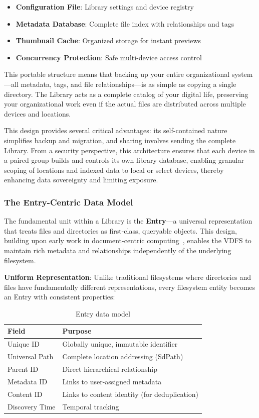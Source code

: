 \documentclass[sigconf]{acmart}
\begin{document}
\begin{itemize}[noitemsep, topsep=0pt]
 \item \textbf{Configuration File}: Library settings and device registry
 \item \textbf{Metadata Database}: Complete file index with relationships and tags
 \item \textbf{Thumbnail Cache}: Organized storage for instant previews
 \item \textbf{Concurrency Protection}: Safe multi-device access control
\end{itemize}

This portable structure means that backing up your entire organizational system—all metadata, tags, and file relationships—is as simple as copying a single directory. The Library acts as a complete catalog of your digital life, preserving your organizational work even if the actual files are distributed across multiple devices and locations.

This design provides several critical advantages: its self-contained nature simplifies backup and migration, and sharing involves sending the complete Library. From a security perspective, this architecture ensures that each device in a paired group builds and controls its own library database, enabling granular scoping of locations and indexed data to local or select devices, thereby enhancing data sovereignty and limiting exposure.

\subsubsection{The Entry-Centric Data Model}
\label{sec:entry-centric}
The fundamental unit within a Library is the \textbf{Entry}---a universal representation that treats files and directories as first-class, queryable objects. This design, building upon early work in document-centric computing~\cite{dourish_presto_1999}, enables the VDFS to maintain rich metadata and relationships independently of the underlying filesystem.

\textbf{Uniform Representation}: Unlike traditional filesystems where directories and files have fundamentally different representations, every filesystem entity becomes an Entry with consistent properties:

\begin{table}[h]
\footnotesize
\centering
\begin{tabular}{@{}ll@{}}
\toprule
\textbf{Field} & \textbf{Purpose} \\
\midrule
Unique ID & Globally unique, immutable identifier \\
Universal Path & Complete location addressing (SdPath) \\
Parent ID & Direct hierarchical relationship \\
Metadata ID & Links to user-assigned metadata \\
Content ID & Links to content identity (for deduplication) \\
Discovery Time & Temporal tracking \\
\bottomrule
\end{tabular}
\caption{Entry data model}
\label{tab:entry-fields}
\end{table}
\end{document}
